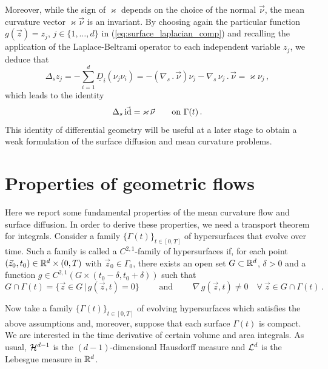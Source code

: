 Moreover, while the sign of $\varkappa$ depends on the choice of the normal
$\vec\nu$, the mean curvature vector $\varkappa \vec\nu$ is an invariant. By
choosing again the particular function $g(\vec z) = z_j$, $j \in \{ 1,
\hdots, d \}$ in (\ref{eq:surface_laplacian_comp}) and recalling the application
of the Laplace-Beltrami operator to each independent variable $z_j$, we deduce
that
\begin{equation}
\Delta_s z_j = - \sum_{i = 1}^{d} \underline{D}_i (\nu_j \nu_i) =
- (\nabla_s \,.\, \vec\nu) \nu_j - \nabla_s \, \nu_j \,.\, \vec\nu = \varkappa
\nu_j\, ,
\end{equation}
which leads to the identity
\begin{equation} \label{eq:LBop}
\Delta_s\, \vec {\rm id} = \varkappa\, \vec\nu \qquad \mbox{on $\Gamma(t)$}\,.
\end{equation}
This identity of differential geometry will be useful at a later stage to
obtain a weak formulation of the surface diffusion and mean curvature problems.

\section{Properties of geometric flows}\label{sec:geometric_flows_properties}
Here we report some fundamental properties of the mean curvature flow and
surface diffusion. In order to derive these properties, we need a transport
theorem for integrals. Consider a family $\{ \Gamma(t) \}_{t \in [0, T]}$
of hypersurfaces that evolve over time. Such a family is called a
$C^{2,1}$-family of hypersurfaces if, for each point $(\vec z_0, t_0) \in
{\mathbb R}^{d} \times (0, T)$ with $\vec z_0 \in \Gamma_0$, there exists an
open set $G \subset {\mathbb R}^{d}$, $\delta > 0$ and a function
$g \in C^{2,1}(G \times (t_0 - \delta, t_0 + \delta))$ such that
\begin{equation}
G \cap \Gamma (t) = \{ \vec{z} \in G \, | \, g (\vec z, t) = 0 \}
\qquad \mbox{ and } \qquad \nabla \, g (\vec z, t) \neq 0
\quad \forall\ \vec z \in G \cap \Gamma(t) \, .
\end{equation}

Now take a family $\{ \Gamma(t) \}_{t \in [0, T]}$ of evolving hypersurfaces
which satisfies the above assumptions and, moreover, suppose that each surface
$\Gamma(t)$ is compact. We are interested in the time derivative of certain
volume and area integrals. As usual, $\mathcal{H}^{d-1}$ is the $(d-1)$-dimensional
Hausdorff measure and $\mathcal{L}^d$ is the Lebesgue measure in ${\mathbb R}^d$.

